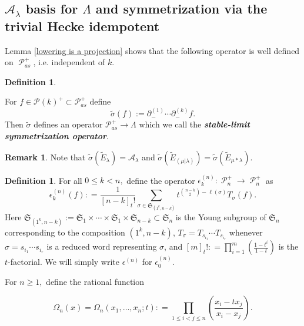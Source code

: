 \documentclass[11pt]{article}
\theoremstyle{definition}
\newtheorem{defi}[theo]{Definition}
\newtheorem{rema}[theo]{Remark}
\numberwithin{equation}{section}
\DeclareMathOperator{\sP}{\mathscr{P} }
\begin{document}
\subsection{\texorpdfstring{$\mathcal{A}_{\lambda}$}{A\_lambda} basis for \texorpdfstring{$\Lambda$}{Lambda} and symmetrization via the trivial Hecke idempotent}\label{symmetrization subsection}

Lemma \ref{lowering is a projection} shows that the following operator is well defined on $\sP_{as}^{+}$, i.e. independent of $k$.
\begin{defi} \label{defn8}

For $f\in \mathscr{P}(k)^{+} \subset \mathscr{P}_{as}^{+}$  define 
\begin{equation}\label{stable limit symmetrization}
    \widetilde{\sigma}(f) := \partial_{-}^{(1)}\cdots \partial_{-}^{(k)} f .
\end{equation} Then $\widetilde{\sigma}$ defines an operator $\mathscr{P}_{as}^{+} \rightarrow \Lambda$ which we call the \textbf{\textit{stable-limit symmetrization operator}}. 
\end{defi}

\begin{rema}
    Note that $\widetilde{\sigma}( \widetilde{E}_{ \lambda}) = \mathcal{A}_{\lambda}$ and $\widetilde{\sigma}(\widetilde{E}_{(\mu|\lambda)}) = \widetilde{\sigma}(\widetilde{E}_{\mu*\lambda}).$ 
\end{rema}


\begin{defi}\label{idempotents}
For all $0 \leq k < n,$ define the operator $\epsilon^{(n)}_k: \sP_n^{+} \rightarrow \sP_n^{+}$ as 
\begin{equation}\label{idempotent eq version 1}
\epsilon^{(n)}_k(f) : = \frac{1}{[n-k]_{t}!} \sum_{\sigma \in \mathfrak{S}_{(1^k,n-k)}} t^{\binom{n-k}{2} - \ell(\sigma)} T_{\sigma}(f).
\end{equation}
Here $\mathfrak{S}_{(1^k,n-k)} := \mathfrak{S}_1\times \cdots \times \mathfrak{S}_1 \times \mathfrak{S}_{n-k} \subset \mathfrak{S}_{n}$ is the Young subgroup of $\mathfrak{S}_{n}$ corresponding to the composition $(1^k,n-k)$, $T_{\sigma} = T_{s_{i_1}}\cdots T_{s_{i_r}}$ whenever $\sigma = s_{i_1}\cdots s_{i_r}$ is a reduced word representing $\sigma$, and $[m]_{t}! : = \prod_{i=1}^{m}(\frac{1-t^i}{1-t})$ is the $t$-factorial. We will simply write $\epsilon^{(n)}$ for $\epsilon^{(n)}_0$.

For $n \geq 1,$ define the rational function 

\begin{equation}\label{HL kernel}
    \Omega_n(x) = \Omega_n(x_1,\ldots,x_n;t): = \prod_{1\leq i<j\leq n}\left(\frac{x_i - tx_j}{x_i - x_j}\right).
\end{equation}

\end{defi}
\end{document}
